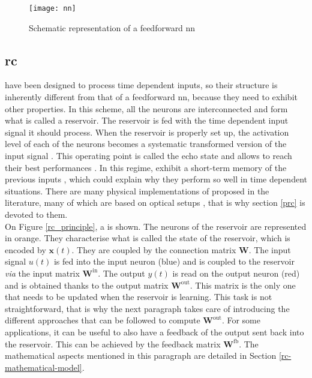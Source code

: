 \begin{figure}[h]
	\centering
	\texttt{[image: nn]}
	\caption{Schematic representation of a feedforward \gls{nn}}
	\label{nn}
\end{figure}


\subsection{\acrlong{rc}}

\rcer have been designed to process time dependent inputs, so their structure is inherently different from that of a feedforward \gls{nn}, because they need to exhibit other properties. In this scheme, all the neurons are interconnected and form what is called a reservoir. The reservoir is fed with the time dependent input signal it should process. When the reservoir is properly set up, the activation level of each of the neurons becomes a systematic transformed version of the input signal \cite{Jaeger2004}. This operating point is called the echo state and allows \rcer to reach their best performances \cite{Goudarzi2014ACS, JaegerH.2001Tesa}. In this regime, \rcer exhibit a short-term memory of the previous inputs \cite{Jaeger2004}, which could explain why they perform so well in time dependent situations. There are many physical implementations of \rcer proposed in the literature, many of which are based on optical setups \cite{VanderSande2017}, that is why section \ref{prc} is devoted to them.\\

On Figure \ref{rc_principle}, a \rcer is shown. The neurons of the reservoir are represented in orange. They characterise what is called the state of the reservoir, which is encoded by $\mathbf{x}(t)$. They are coupled by the connection matrix $\mathbf{W}$. The input signal $u(t)$ is fed into the input neuron (blue) and is coupled to the reservoir \textit{via} the input matrix $\mathbf{W}^{\text{in}}$. The output $y(t)$ is read on the output neuron (red) and is obtained thanks to the output matrix $\mathbf{W}^{\text{out}}$. This matrix is the only one that needs to be updated when the reservoir is learning. This task is not straightforward, that is why the next paragraph takes care of introducing the different approaches that can be followed to compute $\mathbf{W}^{\text{out}}$. For some applications, it can be useful to also have a feedback of the output sent back into the reservoir. This can be achieved by the feedback matrix $\mathbf{W}^{\text{fb}}$. The mathematical aspects mentioned in this paragraph are detailed in Section \ref{rc-mathematical-model}.

